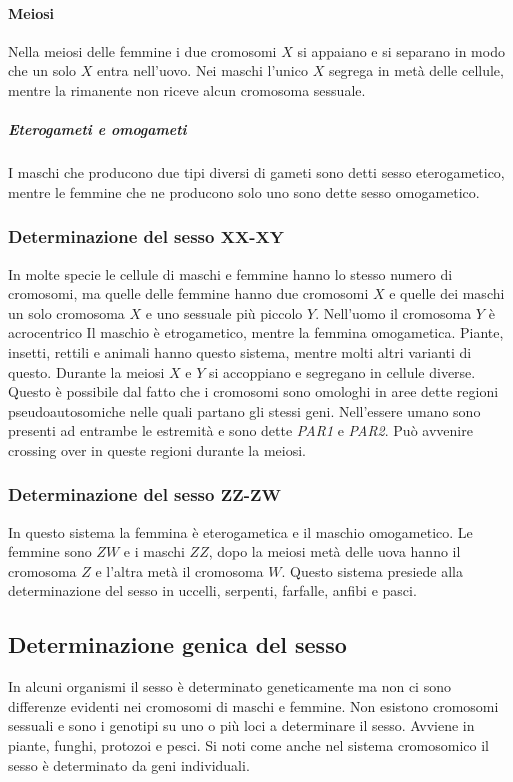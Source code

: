 			\paragraph{Meiosi}
			Nella meiosi delle femmine i due cromosomi $X$ si appaiano e si separano in modo che un solo $X$ entra nell'uovo.
			Nei maschi l'unico $X$ segrega in met\`a delle cellule, mentre la rimanente non riceve alcun cromosoma sessuale.
		
			\subparagraph{Eterogameti e omogameti}
			I maschi che producono due tipi diversi di gameti sono detti sesso eterogametico, mentre le femmine che ne producono solo uno sono dette sesso omogametico.
	
		\subsubsection{Determinazione del sesso $\mathbf{XX}$-$\mathbf{XY}$}
		In molte specie le cellule di maschi e femmine hanno lo stesso numero di cromosomi, ma quelle delle femmine hanno due cromosomi $X$ e quelle dei maschi un solo cromosoma $X$ e uno sessuale pi\`u piccolo $Y$. 
		Nell'uomo il cromosoma $Y$ \`e acrocentrico 
		Il maschio \`e etrogametico, mentre la femmina omogametica.
		Piante, insetti, rettili e animali hanno questo sistema, mentre molti altri varianti di questo.
		Durante la meiosi $X$ e $Y$ si accoppiano e segregano in cellule diverse.
		Questo \`e possibile dal fatto che i cromosomi sono omologhi in aree dette regioni pseudoautosomiche nelle quali partano gli stessi geni. 
		Nell'essere umano sono presenti ad entrambe le estremit\`a e sono dette \emph{PAR1} e \emph{PAR2}.
		Pu\`o avvenire crossing over in queste regioni durante la meiosi. 

		\subsubsection{Determinazione del sesso $\mathbf{ZZ}$-$\mathbf{ZW}$}
		In questo sistema la femmina \`e eterogametica e il maschio omogametico.
		Le femmine sono $ZW$ e i maschi $ZZ$, dopo la meiosi met\`a delle uova hanno il cromosoma $Z$ e l'altra met\`a il cromosoma $W$.
		Questo sistema presiede alla determinazione del sesso in uccelli, serpenti, farfalle, anfibi e pasci.

	\subsection{Determinazione genica del sesso}
	In alcuni organismi il sesso \`e determinato geneticamente ma non ci sono differenze evidenti nei cromosomi di maschi e femmine.
	Non esistono cromosomi sessuali e sono i genotipi su uno o pi\`u loci a determinare il sesso.
	Avviene in piante, funghi, protozoi e pesci.
	Si noti come anche nel sistema cromosomico il sesso \`e determinato da geni individuali.

